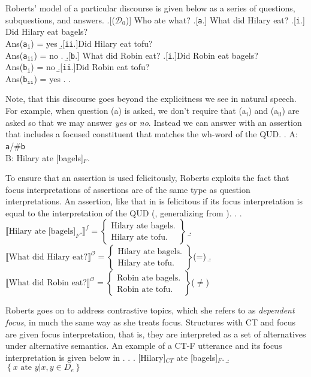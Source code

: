 \documentclass[
	letterpaper,
]{article}
\begin{document}
Roberts' model of a particular discourse is given below as a series of questions, subquestions, and answers. 
\ex.[($\mathcal{D}_0$)] Who ate what?
	\a.[\texttt{a}.] What did Hilary eat?
		\a.[\texttt{i}.] Did Hilary eat bagels?\\
		Ans(\texttt{a}$_\texttt{i}$) = yes
		\b.[\texttt{ii}.]Did Hilary eat tofu?\\
		Ans(\texttt{a}$_\texttt{ii}$) = no
		\z.
	\b.[\texttt{b}.] What did Robin eat?
		\a.[\texttt{i}.]Did Robin eat bagels?\\
		Ans(\texttt{b}$_\texttt{i}$) = no
		\b.[\texttt{ii}.]Did Robin eat tofu?\\
		Ans(\texttt{b}$_\texttt{ii}$) = yes
		\z.
	\z.

Note, that this discourse goes beyond the explicitness we see in natural speech.
For example, when question (a) is asked, we don't require that (a$_\text{i}$) and (a$_\text{ii}$) are asked so that we may answer \textit{yes} or \textit{no}.
Instead we can answer with an assertion that includes a focused constituent that matches the wh-word of the QUD.
\ex. A: \texttt{a}/\#\texttt{b}\\
B: Hilary ate [bagels]$_F$.

To ensure that an assertion is used felicitously, Roberts exploits the fact that focus interpretations of assertions are of the same type as question interpretations.
An assertion, like that in \Last is felicitous if its focus interpretation is equal to the interpretation of the QUD (\cite[31]{roberts2012information}, generalizing from \cite{stechow1991focusing}).
\ex.
\a.
$\llbracket\text{Hilary ate [bagels]}_F.\rrbracket^f = 
\begin{Bmatrix}
  \text{Hilary ate bagels.}\\
  \text{Hilary ate tofu.}
\end{Bmatrix}
$
\b.
$\llbracket\text{What did Hilary eat?}\rrbracket^\mathcal{O} =
\begin{Bmatrix}
  \text{Hilary ate bagels.}\\
  \text{Hilary ate tofu.}
\end{Bmatrix}
$\hfill (=\Last[a])
\b.
$\llbracket\text{What did Robin eat?}\rrbracket^\mathcal{O} =
\begin{Bmatrix}
  \text{Robin ate bagels.}\\
  \text{Robin ate tofu.}
\end{Bmatrix}
$\hfill ($\neq$\Last[a])

Roberts goes on to address contrastive topics, which she refers to as \textit{dependent focus}, in much the same way as she treats focus.
Structures with CT and focus are given focus interpretation, that is, they are interpreted as a set of alternatives under alternative semantics.
An example of a CT-F utterance and its focus interpretation is given below in \Next.
\ex.
\a. [Hilary]$_{CT}$ ate [bagels]$_F$.
\b. $\left\{ x\text{ ate }y | x,y \in D_e \right\}$
\end{document}
